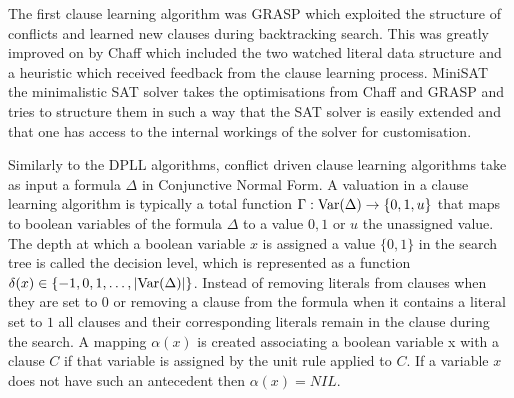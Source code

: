The first clause learning algorithm was GRASP \cite{MS99,MS96} which exploited the structure of conflicts and learned new clauses during backtracking search. This was greatly improved on by Chaff \cite{LZ01} which included the two watched literal data structure and a heuristic which received feedback from the clause learning process. MiniSAT \cite{NE04} the minimalistic SAT solver takes the optimisations from Chaff and GRASP and tries to structure them in such a way that the SAT solver is easily extended and that one has access to the internal workings of the solver for customisation.

Similarly to the DPLL algorithms, conflict driven clause learning algorithms take as input a formula $\Delta$ in Conjunctive Normal Form. 
A valuation in a clause learning algorithm is typically a total function $\Gamma : \mathrm{Var}(\Delta) \to \{0,1,u\}$ that maps to boolean variables of the formula $\Delta$ to a value $0,1$ or $u$ the unassigned value. The depth at which a boolean variable $x$ is assigned a value $\{0,1\}$ in the search tree is called the decision level, which is represented as a function $\delta(x) \in \{-1,0,1, \ldots, |\mathrm{Var}(\Delta)| \} $. Instead of removing literals from clauses when they are set to $0$ or removing a clause from the formula when it contains a literal set to $1$ all clauses and their corresponding literals remain in the clause during the search. A mapping $\alpha(x)$ is created associating a boolean variable x with a clause $C$ if that variable is assigned by the unit rule applied to $C$. If a variable $x$ does not have such an antecedent then $\alpha(x) = NIL$.

